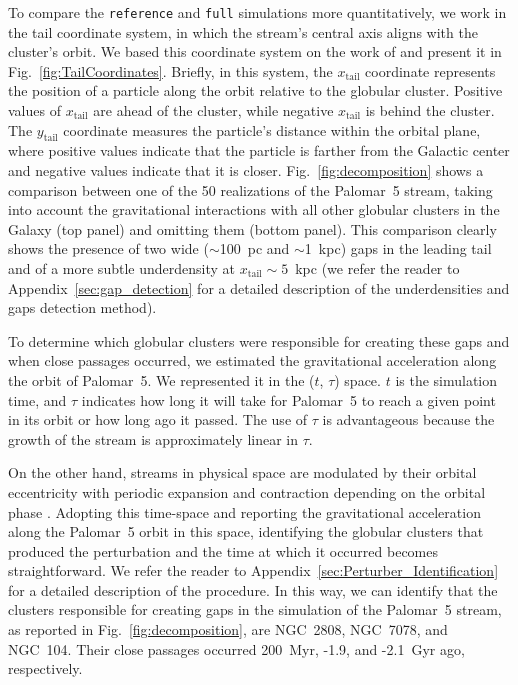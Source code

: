         To compare the \texttt{reference} and \texttt{full} simulations more quantitatively, we work in the tail coordinate system, in which the stream's central axis aligns with the cluster's orbit. We based this coordinate system on the work of \citet{2004AJ....127.2753D} and present it in Fig.~\ref{fig:TailCoordinates}. Briefly, in this system, the $x_{\mathrm{tail}}$ coordinate represents the position of a particle along the orbit relative to the globular cluster. Positive values of $x_{\mathrm{tail}}$ are ahead of the cluster, while negative $x_{\mathrm{tail}}$ is behind the cluster. The $y_{\mathrm{tail}}$ coordinate measures the particle's distance within the orbital plane, where positive values indicate that the particle is farther from the Galactic center and negative values indicate that it is closer. Fig.~\ref{fig:decomposition} shows a comparison between one of the 50 realizations of the Palomar~5 stream, taking into account the gravitational interactions with all other globular clusters in the Galaxy (top panel) and omitting them (bottom panel). This comparison clearly shows the presence of two wide ($\sim$100~pc and $\sim$1~kpc) gaps in the leading tail and of a more subtle underdensity at $x_{\mathrm{tail}}\sim 5$~kpc (we refer the reader to Appendix~\ref{sec:gap_detection} for a detailed description of the underdensities and gaps detection method). 
    
        To determine which globular clusters were responsible for creating these gaps and when close passages occurred, we estimated the gravitational acceleration along the orbit of Palomar~5. We represented it in the ($t$, $\tau$) space. $t$ is the simulation time, and $\tau$ indicates how long it will take for Palomar~5 to reach a given point in its orbit or how long ago it passed. The use of $\tau$ is advantageous because the growth of the stream is approximately linear in $\tau$. 
    
        On the other hand, streams in physical space are modulated by their orbital eccentricity with periodic expansion and contraction depending on the orbital phase \citep[see the top panel of Fig.~5.][for an example]{2016MNRAS.457.3817S}. Adopting this time-space and reporting the gravitational acceleration along the Palomar~5 orbit in this space, identifying the globular clusters that produced the perturbation and the time at which it occurred becomes straightforward. We refer the reader to Appendix~\ref{sec:Perturber_Identification} for a detailed description of the procedure. In this way, we can identify that the clusters responsible for creating gaps in the simulation of the Palomar~5 stream, as reported in Fig.~\ref{fig:decomposition}, are NGC~2808, NGC~7078, and NGC~104. Their close passages occurred 200~Myr, -1.9, and -2.1~Gyr ago, respectively. 
    
